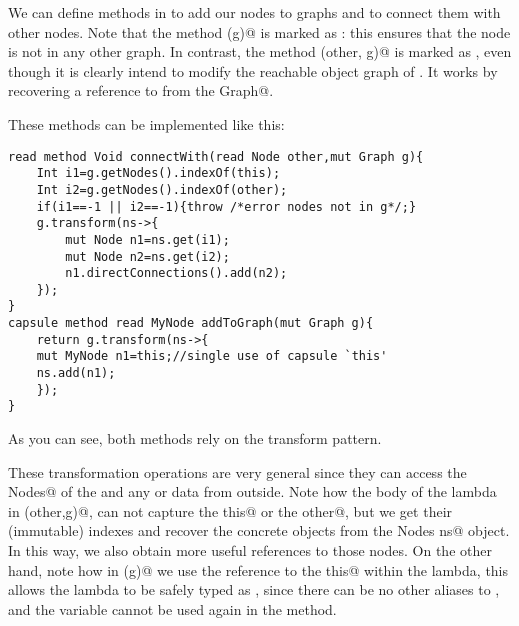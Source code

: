 We can define methods in \Q@MyNode@ to add our nodes
to graphs and to connect them with other nodes.
Note that the method \Q@addToGraph(g)@ is marked as \Q@capsule@: this ensures that the node is not in any other graph.
In contrast, the method \Q@connectWith(other, g)@ is marked as \Q@read@, even though it is clearly intend to modify the reachable object graph of \Q@this@.
It works by recovering a \Q@mut@ reference to \Q@this@ from the \Q@mut Graph@.

These methods can be implemented like this:
\begin{lstlisting}
read method Void connectWith(read Node other,mut Graph g){
	Int i1=g.getNodes().indexOf(this);
	Int i2=g.getNodes().indexOf(other);
	if(i1==-1 || i2==-1){throw /*error nodes not in g*/;}
	g.transform(ns->{
		mut Node n1=ns.get(i1);
		mut Node n2=ns.get(i2);
		n1.directConnections().add(n2);
	});
}
capsule method read MyNode addToGraph(mut Graph g){
	return g.transform(ns->{
	mut MyNode n1=this;//single use of capsule `this'
	ns.add(n1);
	});
}
\end{lstlisting}
As you can see, both methods rely on the transform pattern.

These transformation operations are very general since they
can access the \Q@mut Nodes@ of the \Q@Graph@ and 
any \Q@rep@ or \Q@imm@ data from outside.
Note how the body of the \Q@capsule@ lambda in \Q@connectWith(other,g)@, can not capture the \Q@read this@ or the \Q@read other@, but we get their (immutable) indexes 
and recover the concrete objects from the \Q@mut Nodes ns@ object.
In this way, we also obtain more useful \Q@mut@ references to those nodes.
On the other hand, note how in \Q@addToGraph(g)@ we use the reference to the \Q@capsule this@ within the lambda, this allows the lambda to be safely typed as \Q@capsule@, since there can be no other aliases to \Q@this@, and the \Q@this@ variable cannot be used again in the method.
